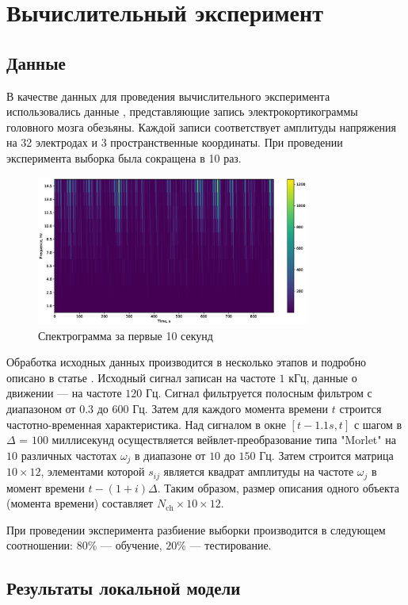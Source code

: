 \documentclass[12pt, twoside]{article}
\begin{document}
\section{Вычислительный эксперимент}
\subsection{Данные}
В качестве данных для проведения вычислительного эксперимента использовались данные \cite{chao2010long}, представляющие запись электрокортикограммы головного мозга обезьяны. Каждой записи соответствует амплитуды напряжения на 32 электродах и 3 пространственные координаты.
При проведении эксперимента выборка была сокращена в 10 раз.

\begin{figure}[H]
	\centering
	\includegraphics[width=0.8\textwidth]{../figs/spectrogram.eps}
	\caption{Спектрограмма за первые 10 секунд}
\end{figure}
Обработка исходных данных производится в несколько этапов и подробно описано в статье \cite{zhao2010ecog}. Исходный сигнал записан на частоте $1$ кГц, данные о движении — на частоте $120 $ Гц. Сигнал фильтруется полосным фильтром с диапазоном от $0.3$ до $600 $ Гц. Затем для каждого момента времени $t$ строится частотно-временная
характеристика. Над сигналом в окне $[t - 1.1s, t]$ с шагом в $\Delta$ = $100$ миллисекунд осуществляется вейвлет-преобразование типа "Morlet" на $10$ различных частотах $\omega_j$ в диапазоне от $10$ до $150$ Гц. Затем строится матрица \mbox{$10 \times 12$}, элементами которой $s_{ij}$ является квадрат амплитуды на частоте $\omega_j$ в момент времени \mbox{$t - (1 + i)\Delta$}. Таким образом, размер описания одного объекта (момента времени) составляет $N_\text{ch} \times 10 \times 12$.

При проведении эксперимента разбиение выборки производится в следующем соотношении: $80\%$ --- обучение, $20\%$ --- тестирование.
\FloatBarrier
\subsection{Результаты локальной модели}
\end{document}
